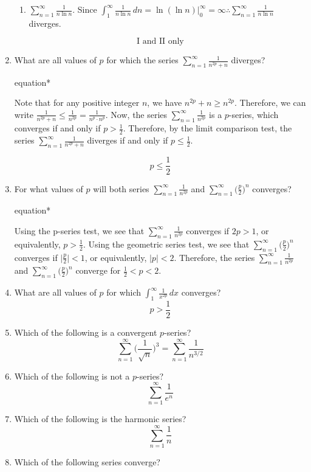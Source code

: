 \documentclass[12pt]{article}
\begin{document}
\begin{enumerate}
\begin{enumerate}[label=\Roman*.]
	      	\item $\sum_{n=1}^{\infty} \frac{1}{n\ln n}$. Since $\int_{1}^{\infty} \frac{1}{n\ln n} \, dn = \ln(\ln n) \big\rvert_{0}^{\infty} = \infty \therefore \sum_{n=1}^{\infty} \frac{1}{n\ln n}$ diverges.
	      \end{enumerate}
		  $$\boxed{\text{I and II only}}$$
	\item What are all values of $p$ for which the series $\sum_{n=1}^{\infty} \frac{1}{n^{2p}+n}$ diverges?
		  \begin{empheq}[box = \tcbhighmath]{equation*}
			\parbox{6in}{Note that for any positive integer $n$, we have $n^{2p} + n \geq n^{2p}$. Therefore, we can write
			$\frac{1}{n^{2p}+n} \leq \frac{1}{n^{2p}} = \frac{1}{n^{p}\cdot n^{p}}.$ Now, the series $\sum_{n=1}^{\infty} \frac{1}{n^{2p}}$ is a $p$-series, which converges if and only if $p > \frac{1}{2}$. Therefore, by the limit comparison test, the series $\sum_{n=1}^{\infty} \frac{1}{n^{2p}+n}$ diverges if and only if $p \leq \frac{1}{2}$.}
		  \end{empheq}
		  $$\boxed{p \leq \frac{1}{2}}$$
	\item For what values of $p$ will both series $\sum_{n=1}^{\infty} \frac{1}{n^{2p}}$ and $\sum_{n=1}^{\infty} \big(\frac{p}{2}\big)^n$ converges?
		  \begin{empheq}[box = \tcbhighmath]{equation*}
			\parbox{6in}{Using the p-series test, we see that $\sum_{n=1}^{\infty} \frac{1}{n^{2p}}$ converges if $2p > 1$, or equivalently, $p > \frac{1}{2}$. Using the geometric series test, we see that $\sum_{n=1}^{\infty} \big(\frac{p}{2}\big)^n$ converges if $\big|\frac{p}{2}\big| < 1$, or equivalently, $|p| < 2$. Therefore, the series $\sum_{n=1}^{\infty} \frac{1}{n^{2p}}$ and $\sum_{n=1}^{\infty} \big(\frac{p}{2}\big)^n$ converge for $\boxed{\frac{1}{2} < p < 2}$.}
		  \end{empheq}
	\item What are all values of $p$ for which $\int_{1}^{\infty}\frac{1}{x^{2p}}\, dx$ converges?
	$$\boxed{p > \frac{1}{2}}$$
	\item Which of the following is a convergent $p$-series?
	$$\boxed{\sum_{n=1}^{\infty} \bigg(\frac{1}{\sqrt{n}}\bigg)^3 =\sum_{n=1}^{\infty} \frac{1}{n^{3/2}}} $$
	\item Which of the following is not a $p$-series?
	$$\boxed{\sum_{n=1}^{\infty} \frac{1}{e^n}}$$
	\item Which of the following is the harmonic series?
	$$\boxed{\sum_{n=1}^{\infty} \frac{1}{n}}$$
	\item Which of the following series converge?

\end{enumerate}
\end{document}
